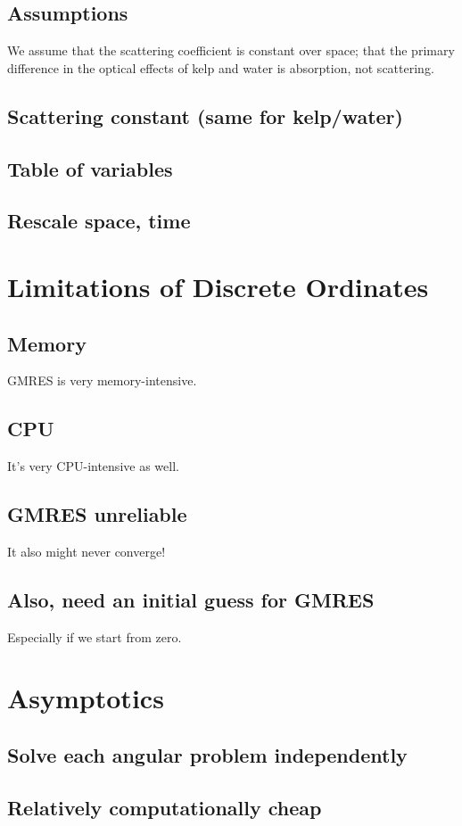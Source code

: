\documentclass[10pt]{article}
\begin{document}
\subsection{Assumptions}
We assume that the scattering coefficient is constant over space; that the
primary difference in the optical effects of kelp and water is absorption, not
scattering.

\subsection{Scattering constant (same for kelp/water)}
\subsection{Table of variables}
\subsection{Rescale space, time}

\section{Limitations of Discrete Ordinates}
\subsection{Memory}
GMRES is very memory-intensive.
\subsection{CPU}
It's very CPU-intensive as well.
\subsection{GMRES unreliable}
It also might never converge!
\subsection{Also, need an initial guess for GMRES}
Especially if we start from zero.
  
\section{Asymptotics}
\subsection{Solve each angular problem independently}
\subsection{Relatively computationally cheap}
\end{document}
